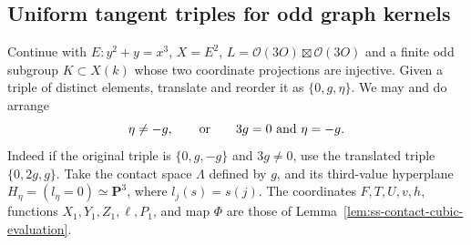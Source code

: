\subsection{Uniform tangent triples for odd graph kernels}
\label{subsec:ss-uniform-tangent-triples}

Continue with $E:y^2+y=x^3$, $X=E^2$, $L=\mathcal O(3O)\boxtimes
\mathcal O(3O)$ and a finite odd subgroup $K\subset X(k)$ whose
two coordinate projections are injective. Given a triple of distinct
elements, translate and reorder it as $\{0,g,\eta\}$.
We may and do arrange
\[
 \eta\ne-g,\qquad\hbox{or}\qquad 3g=0\ \hbox{and}\ \eta=-g.
\]
Indeed if the original triple is $\{0,g,-g\}$ and $3g\ne0$, use
the translated triple $\{0,2g,g\}$. Take the contact space
$\Lambda$ defined by $g$, and its third-value hyperplane
$H_\eta=(l_\eta=0)\simeq\mathbf P^3$, where $l_j(s)=s(j)$.
The coordinates $F,T,U,v,h$, functions $X_1,Y_1,Z_1,\ell,P_1$,
and map $\Phi$ are those of
Lemma~\ref{lem:ss-contact-cubic-evaluation}.

